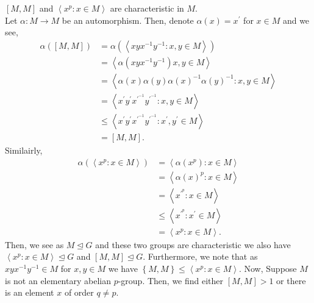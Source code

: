 \documentclass[a4paper]{article}
\begin{document}
	\begin{lemma}
		\(\left[ M, M \right] \)  and \(\left<x^{p} : x \in M \right> \)  are characteristic in \(M\).\\
		Let \(\alpha: M \to M\) be an automorphism. Then, denote \(\alpha\left( x \right)  = x^{\prime}\)  for \(x \in M\) and we see,
		\begin{align*}
			\alpha\left( \left[ M, M \right]  \right) &= \alpha\left( \left<xyx^{-1}y^{-1} : x, y \in M \right> \right)  \\
								  &= \left<\alpha\left( xyx^{-1}y^{-1} \right) x, y \in M \right>  \\
								  &= \left<\alpha\left( x \right) \alpha\left( y \right) \alpha\left( x \right) ^{-1} \alpha\left( y \right)^{-1} : x, y \in M  \right>  \\
								  &= \left<x^{\prime} y^{\prime} x^{\prime}^{-1} y^{\prime}^{-1} : x, y \in M \right>  \\
								  &\le \left<x^{\prime}y^{\prime}x^{\prime}^{-1}y^{\prime}^{-1} : x^{\prime}, y^{\prime} \in  M \right>  \\
								  &=  \left[ M, M \right]
		.\end{align*}
		Similairly,
		\begin{align*}
			\alpha \left( \left<x^{p} : x\in M \right>  \right) &= \left<\alpha\left( x^{p} \right): x \in M  \right>  \\
									    &= \left<\alpha\left( x \right) ^{p} : x \in M \right>  \\
									    &= \left<x^{\prime}^{p} : x \in M \right>  \\
									    &\le \left<x^{\prime}^{p} : x^{\prime} \in M \right>\\
									    &= \left<x^{p} : x \in M \right>
		.\end{align*}
Then, we see as \(M \trianglelefteq G\) and these two groups are characteristic we also have \(\left<x^{p}: x\in M \right> \trianglelefteq G \) and \(\left[ M, M \right] \trianglelefteq G\). Furthermore, we note that as \(xyx^{-1}y^{-1} \in M\)  for \(x, y \in M\) we have \(\left\{ M, M \right\}  \le \left<x^{p}: x\in M \right> \). Now,
Suppose \(M\) is not an elementary abelian \(p\)-group. Then, we find either \(\left[ M, M \right] > 1\)  or there is an element \(x\) of order \(q \neq p\).
	\end{lemma}
\end{document}
